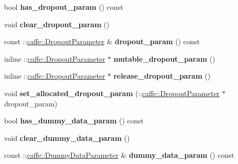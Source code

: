 \begin{DoxyCompactItemize}
bool {\bfseries has\+\_\+dropout\+\_\+param} () const
\item 
\mbox{\label{classcaffe_1_1_layer_parameter_a129cc7e885e5c302436025b39740df7d}} 
void {\bfseries clear\+\_\+dropout\+\_\+param} ()
\item 
\mbox{\label{classcaffe_1_1_layer_parameter_a0b2cd417fbe4b57443ec31e28c0cb4b7}} 
const \+::\mbox{\hyperlink{classcaffe_1_1_dropout_parameter}{caffe\+::\+Dropout\+Parameter}} \& {\bfseries dropout\+\_\+param} () const
\item 
\mbox{\label{classcaffe_1_1_layer_parameter_a88f60af48d4fff2477a08155855e109c}} 
inline \+::\mbox{\hyperlink{classcaffe_1_1_dropout_parameter}{caffe\+::\+Dropout\+Parameter}} $\ast$ {\bfseries mutable\+\_\+dropout\+\_\+param} ()
\item 
\mbox{\label{classcaffe_1_1_layer_parameter_a2b36da353d422ee207ff20bd0451763e}} 
inline \+::\mbox{\hyperlink{classcaffe_1_1_dropout_parameter}{caffe\+::\+Dropout\+Parameter}} $\ast$ {\bfseries release\+\_\+dropout\+\_\+param} ()
\item 
\mbox{\label{classcaffe_1_1_layer_parameter_a73cff9def6ef690c74c0eb27dba8aedf}} 
void {\bfseries set\+\_\+allocated\+\_\+dropout\+\_\+param} (\+::\mbox{\hyperlink{classcaffe_1_1_dropout_parameter}{caffe\+::\+Dropout\+Parameter}} $\ast$dropout\+\_\+param)
\item 
\mbox{\label{classcaffe_1_1_layer_parameter_a5129d1ac6da1dba8c4f596a825aea332}} 
bool {\bfseries has\+\_\+dummy\+\_\+data\+\_\+param} () const
\item 
\mbox{\label{classcaffe_1_1_layer_parameter_afd812946e1390b585b79a38e1ea73b21}} 
void {\bfseries clear\+\_\+dummy\+\_\+data\+\_\+param} ()
\item 
\mbox{\label{classcaffe_1_1_layer_parameter_a0cc722a42b3708be24fd6fe4a9654844}} 
const \+::\mbox{\hyperlink{classcaffe_1_1_dummy_data_parameter}{caffe\+::\+Dummy\+Data\+Parameter}} \& {\bfseries dummy\+\_\+data\+\_\+param} () const

\end{DoxyCompactItemize}
